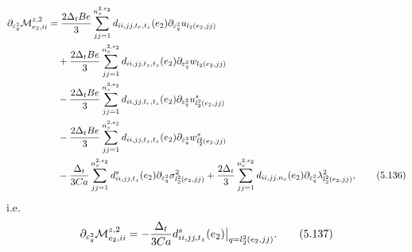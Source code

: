 \documentclass{article}
\begin{document}
\begin{align}
\partial_{\varepsilon_q^2}\mathcal{M}_{e_2,ii}^{z,2} &= \frac{2\Delta_t Be}{3} \sum_{jj=1}^{n_v^{2,e_2}} d_{ii,jj,t_r,t_z}(e_2) \partial_{\varepsilon_q^2} u_{l_2(e_2,jj)} \nonumber\\
&\quad + \frac{2\Delta_t Be}{3} \sum_{jj=1}^{n_v^{2,e_2}} d_{ii,jj,t_z,t_z}(e_2) \partial_{\varepsilon_q^2} w_{l_2(e_2,jj)} \nonumber\\
&\quad - \frac{2\Delta_t Be}{3} \sum_{jj=1}^{n_v^{2,e_2}} d_{ii,jj,t_r,t_z}(e_2) \partial_{\varepsilon_q^2} u_{l_2^2(e_2,jj)}^s \nonumber\\
&\quad - \frac{2\Delta_t Be}{3} \sum_{jj=1}^{n_v^{2,e_2}} d_{ii,jj,t_z,t_z}(e_2) \partial_{\varepsilon_q^2} w_{l_2^2(e_2,jj)}^s \nonumber\\
&\quad - \frac{\Delta_t}{3Ca} \sum_{jj=1}^{n_v^{2,e_2}} d_{ii,jj,t_z}^s(e_2) \partial_{\varepsilon_q^2} \sigma_{l_2^2(e_2,jj)}^2 + \frac{2\Delta_t}{3} \sum_{jj=1}^{n_v^{2,e_2}} d_{ii,jj,n_z}(e_2) \partial_{\varepsilon_q^2} \lambda_{l_2^2(e_2,jj)}^2, \tag{5.136}
\end{align}
i.e.
\begin{equation}
\partial_{\varepsilon_q^2}\mathcal{M}_{e_2,ii}^{z,2} = -\frac{\Delta_t}{3Ca} d_{ii,jj,t_z}^s(e_2) \big|_{q=l_2^2(e_2,jj)}. \tag{5.137}
\end{equation}
\end{document}
